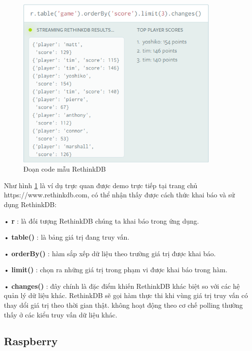 \begin{figure}[H]
	\centering    
	\includegraphics[width=0.9\textwidth]{rethink1}
	\caption[Đoạn code mẫu RethinkDB]{Đoạn code mẫu RethinkDB}
	\label{fig: rethink1}
\end{figure}

Như hình \ref{fig: rethink1} là ví dụ trực quan được demo trực tiếp tại trang chủ https://www.rethinkdb.com, có thể nhận thấy được cách thức khai báo và sử dụng RethinkDB:

• \textbf{r} : là đối tượng RethinkDB chúng ta khai báo trong ứng dụng.

• \textbf{table()} : là bảng giá trị đang truy vấn.

• \textbf{orderBy()} : hàm sắp xếp dữ liệu theo trường giá trị được khai báo.

• \textbf{limit()} : chọn ra những giá trị trong phạm vi được khai báo trong hàm.

• \textbf{changes()} : đây chính là đặc điểm khiến RethinkDB khác biệt so với các hệ quản lý dữ liệu khác. RethinkDB sẽ gọi hàm thực thi khi vùng giá trị truy vấn có thay dổi giá trị theo thời gian thật. không hoạt động theo cơ chế polling thường thấy ở các kiểu truy vấn dữ liệu khác.

\subsection{Raspberry}

